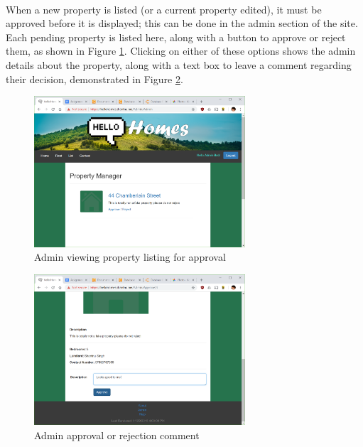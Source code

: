 \documentclass{article}
\begin{document}
        \paragraph{}
            When a new property is listed (or a current property edited), it must be approved before it is displayed; this can be done in the admin section of the site.
            Each pending property is listed here, along with a button to approve or reject them, as shown in Figure \ref{fig:admin_page}.
            Clicking on either of these options shows the admin details about the property, along with a text box to leave a comment regarding their decision, demonstrated in Figure \ref{fig:admin_approval}.

            \begin{figure}[!htb]
                \centering
                \includegraphics[width=0.7\textwidth]{figures/admin_page.png}
                \caption[Approve Property]{Admin viewing property listing for approval}
                \label{fig:admin_page}
            \end{figure}

            \begin{figure}[!htb]
                \centering
                \includegraphics[width=0.7\textwidth]{figures/admin_approval.png}
                \caption[Comment on Property]{Admin approval or rejection comment}
                \label{fig:admin_approval}
            \end{figure}
\end{document}

